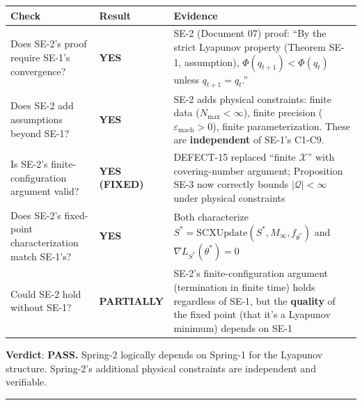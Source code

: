 \documentclass[
  12pt,
]{ctexart}
\begin{document}
\begin{longtable}[]{@{}
  >{\raggedright\arraybackslash}p{}
  >{\raggedright\arraybackslash}p{}
  >{\raggedright\arraybackslash}p{}@{}}
\toprule\noalign{}
\begin{minipage}[b]{\linewidth}\raggedright
Check
\end{minipage} & \begin{minipage}[b]{\linewidth}\raggedright
Result
\end{minipage} & \begin{minipage}[b]{\linewidth}\raggedright
Evidence
\end{minipage} \\
\midrule\noalign{}
\endhead
\bottomrule\noalign{}
\endlastfoot
Does SE-2's proof require SE-1's convergence? & \textbf{YES} & SE-2
(Document 07) proof: ``By the strict Lyapunov property (Theorem SE-1,
assumption), \(\Phi(q_{t+1}) < \Phi(q_t)\) unless
\(q_{t+1} = q_t\).'' \\
Does SE-2 add assumptions beyond SE-1? & \textbf{YES} & SE-2 adds
physical constraints: finite data (\(N_{\max} < \infty\)), finite
precision (\(\varepsilon_{\text{mach}} > 0\)), finite parameterization.
These are \textbf{independent} of SE-1's C1-C9. \\
Is SE-2's finite-configuration argument valid? & \textbf{YES (FIXED)} &
DEFECT-15 replaced ``finite \(\mathcal{X}\)'' with covering-number
argument; Proposition SE-3 now correctly bounds
\(|\mathcal{Q}| < \infty\) under physical constraints \\
Does SE-2's fixed-point characterization match SE-1's? & \textbf{YES} &
Both characterize
\(S^* = \text{SCXUpdate}(S^*, M_\infty, f_{\theta^*})\) and
\(\nabla L_{S^*}(\theta^*) = 0\) \\
Could SE-2 hold without SE-1? & \textbf{PARTIALLY} & SE-2's
finite-configuration argument (termination in finite time) holds
regardless of SE-1, but the \textbf{quality} of the fixed point (that
it's a Lyapunov minimum) depends on SE-1 \\
\end{longtable}

\textbf{Verdict}: \textbf{PASS.} Spring-2 logically depends on Spring-1
for the Lyapunov structure. Spring-2's additional physical constraints
are independent and verifiable.

\begin{center}\rule{0.5\linewidth}{0.5pt}\end{center}
\end{document}
